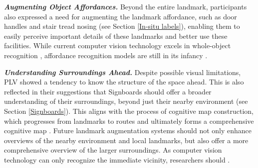 \textbf{\textit{Augmenting Object Affordances.}} Beyond the entire landmark, participants also expressed a need for augmenting the landmark affordance, such as door handles and stair tread nosing (see Section \ref{In-situ labels}), enabling them to easily perceive important details of these landmarks and better use these facilities. While current computer vision technology excels in whole-object recognition \cite{he2016deep,redmon2016you,liu2021swin}, affordance recognition models are still in its infancy \cite{chuang2018learning,luddecke2017learning, luo2022learning}. 



\textbf{\textit{Understanding Surroundings Ahead.}} Despite possible visual limitations, PLV showed a tendency to know the structure of the space ahead. This is also reflected in their suggestions that Signboards should offer a broader understanding of their surroundings, beyond just their nearby environment (see Section \ref{Signboards}). This aligns with the process of cognitive map construction, which progresses from landmarks to routes and ultimately forms a comprehensive cognitive map \cite{siegel1975development}. Future landmark augmentation systems should not only enhance overviews of the nearby environment and local landmarks, but also offer a more comprehensive overview of the larger surroundings. As computer vision technology can only recognize the immediate vicinity, researchers should . 

